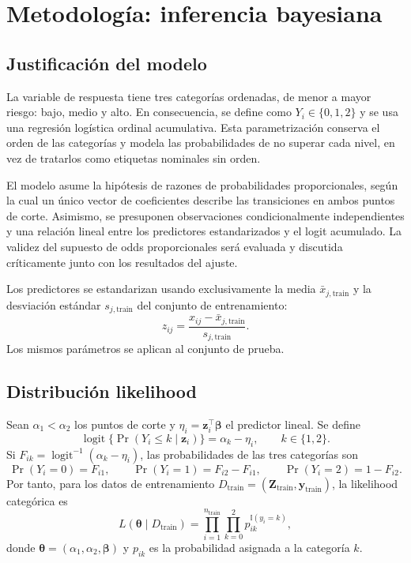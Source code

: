 \section{Metodología: inferencia bayesiana}
\subsection{Justificación del modelo}
La variable de respuesta tiene tres categorías ordenadas, de menor a mayor
riesgo: bajo, medio y alto. En consecuencia, se define como $Y_i\in\{0,1,2\}$ y se
usa una regresión logística ordinal acumulativa. Esta parametrización conserva
el orden de las categorías y modela las probabilidades de no superar cada nivel,
en vez de tratarlos como etiquetas nominales sin orden.

El modelo asume la hipótesis de razones de probabilidades proporcionales,
según la cual un único vector de coeficientes describe las transiciones en ambos puntos de corte.
Asimismo, se presuponen observaciones condicionalmente independientes y una relación lineal entre
los predictores estandarizados y el logit acumulado. La validez del supuesto de odds proporcionales
será evaluada y discutida críticamente junto con los resultados del ajuste.

Los predictores se estandarizan usando exclusivamente la media
$\bar{x}_{j,\mathrm{train}}$ y la desviación estándar $s_{j,\mathrm{train}}$
del conjunto de entrenamiento:
\[
z_{ij}=\frac{x_{ij}-\bar{x}_{j,\mathrm{train}}}{s_{j,\mathrm{train}}}.
\]
Los mismos parámetros se aplican al conjunto de prueba.

\subsection{Distribución likelihood}
Sean $\alpha_1<\alpha_2$ los puntos de corte y
$\eta_i=\mathbf{z}_i^\top\boldsymbol{\beta}$ el predictor lineal. Se define
\[
\operatorname{logit}\{\Pr(Y_i\leq k\mid\mathbf{z}_i)\}
=\alpha_k-\eta_i,\qquad k\in\{1,2\}.
\]
Si $F_{ik}=\operatorname{logit}^{-1}(\alpha_k-\eta_i)$, las probabilidades de
las tres categorías son
\[
\Pr(Y_i=0)=F_{i1},\qquad
\Pr(Y_i=1)=F_{i2}-F_{i1},\qquad
\Pr(Y_i=2)=1-F_{i2}.
\]
Por tanto, para los datos de entrenamiento
$D_{\mathrm{train}}=(\mathbf{Z}_{\mathrm{train}},\mathbf{y}_{\mathrm{train}})$,
la likelihood categórica es
\[
L(\boldsymbol{\theta}\mid D_{\mathrm{train}})
=\prod_{i=1}^{n_{\mathrm{train}}}
\prod_{k=0}^{2}p_{ik}^{\mathbb{I}(y_i=k)},
\]
donde $\boldsymbol{\theta}=(\alpha_1,\alpha_2,\boldsymbol{\beta})$ y $p_{ik}$
es la probabilidad asignada a la categoría $k$.

